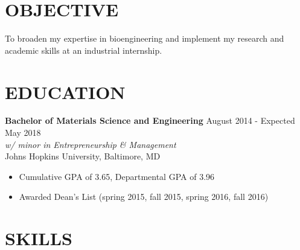 \documentclass[line, 10pt]{res} %
\begin{document}
\begin{resume}

 
\section{\large OBJECTIVE}  

To broaden my expertise in bioengineering and implement my research and academic skills at an industrial internship. 

\vspace{-0.2cm}
\section{\large EDUCATION}

{\bf Bachelor of Materials Science and Engineering}  \hfill August 2014 - Expected May 2018 \\
{\sl w/ minor in Entrepreneurship \& Management}\\
Johns Hopkins University, Baltimore, MD\\
\begin{itemize}
\vspace{-.4cm}
\item Cumulative GPA of 3.65, Departmental GPA of 3.96
\vspace{-.1cm}
\item Awarded Dean's List (spring 2015, fall 2015, spring 2016, fall 2016)
\end{itemize}
 
\vspace{-0.2cm}
\section{\large SKILLS} 


\end{resume}
\end{document}
